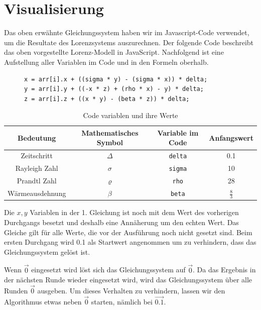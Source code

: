 
\section{Visualisierung}
Das oben erwähnte Gleichungssystem haben wir im Javascript-Code verwendet, um die Resultate des Lorenzsystems auszurechnen. Der folgende Code beschreibt das oben vorgestellte Lorenz-Modell in JavaScript. Nachfolgend ist eine Aufstellung aller Variablen im Code und in den Formeln oberhalb.

\begin{figure}
	\begin{lstlisting}[style=C]
x = arr[i].x + ((sigma * y) - (sigma * x)) * delta;
y = arr[i].y + ((-x * z) + (rho * x) - y) * delta;
z = arr[i].z + ((x * y) - (beta * z)) * delta;
		\end{lstlisting}
\end{figure}

\begin{table}[]
	\begin{tabular}{| c | c | c | c |}
		\hline
		\textbf{Bedeutung} & \textbf{Mathematisches Symbol} & \textbf{Variable im Code} & \textbf{Anfangswert}\\\hline
		Zeitschritt & $ \Delta $ & \texttt{delta} & 0.1 \\\hline
		Rayleigh Zahl & $ \sigma $ & \texttt{sigma} & 10 \\\hline
		Prandtl Zahl & $\varrho $ & \texttt{rho} & 28 \\\hline
		Wärmeausdehnung & $\beta $ & \texttt{beta}  & $ \frac{8}{3} $ \\\hline
	\end{tabular}
	\caption{Code variablen und ihre Werte\label{CodeVariablen}}
\end{table}

Die $ x, y $ Variablen in der 1. Gleichung ist noch mit dem Wert des vorherigen Durchgangs besetzt und deshalb eine Annäherung um den echten Wert. Das Gleiche gilt für alle Werte, die vor der Ausführung noch nicht gesetzt sind. 
Beim ersten Durchgang wird 0.1 als Startwert angenommen um zu verhindern, dass das Gleichungssystem gelöst ist. 

Wenn $ \vec{0} $ eingesetzt wird löst sich das Gleichungssystem auf $ \vec{0} $. Da das Ergebnis in der nächsten Runde wieder eingesetzt wird, wird das Gleichungssystem über alle Runden $ \vec{0} $ ausgeben. Um dieses Verhalten zu verhindern, lassen wir den Algorithmus etwas neben $ \vec{0} $ starten, nämlich bei $ \vec{0.1} $.

